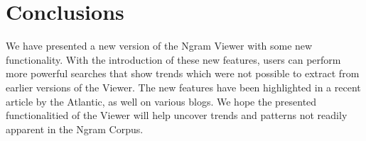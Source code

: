 \documentclass[11pt,a4paper]{article}
\newcommand{\jmcomment}[1]{\textcolor{magenta}{[$^{\textsc{J}}_{\textsc{M}}$ #1]}}
\newcommand{\eat}[1]{\ignorespaces}
\begin{document}
\section{Conclusions}
We have presented a new version of the Ngram Viewer with some new functionality. With the introduction of these new features, users can perform more powerful searches that show trends which were not possible to extract from earlier versions of the Viewer. The new features have been highlighted in a recent article by the Atlantic, as well on various blogs.
We hope the presented functionalitied of the Viewer will help uncover trends and patterns not readily apparent in the Ngram Corpus.

\eat{\jmcomment{Blog posts/entries from the internet:
http://sciencerefinery.com/2013/10/28/google-ngram-viewer-now-more-powerful-than-ever/
http://www.devingriffiths.com/google-books/google-n-gram-studies/
http://languagelog.ldc.upenn.edu/nll/?p=8472
http://www.textualscholarship.nl/?p=14051}}

\eat{\section{Acknowledgements}
We would like to thank John DeNero, ...}



\end{document}

